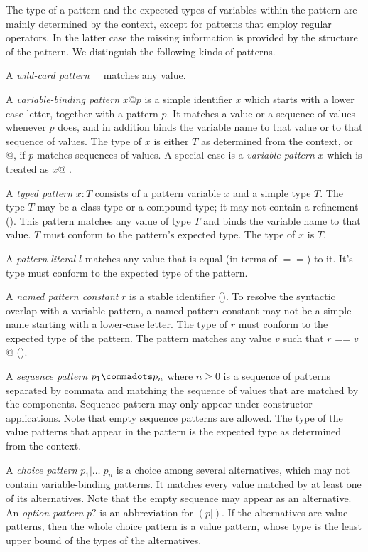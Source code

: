 \documentclass[11pt]{report}
\begin{document}
The type of a pattern and the expected types of variables within the
pattern are mainly determined by the context, except for patterns
that employ regular operators. In the latter case  the missing 
information is provided by the structure of the pattern. 
We distinguish the following kinds of patterns.

A {\em wild-card pattern} \_ matches any value. 

A {\em variable-binding pattern} $x @ p$ is a simple identifier $x$
which starts with a lower case letter, together with a pattern $p$. It
matches a value or a sequence of values whenever $p$ does, and in
addition binds the variable name to that value or to that sequence of
values. The type of $x$ is either $T$ as determined from the context, or
\verb@List[ T ]@, if $p$ matches sequences of values. A
special case is a {\em variable pattern} $x$ which is treated as $x @
\_$. 

A {\em typed pattern} $x: T$ consists of a pattern variable $x$ and a
simple type $T$. The type $T$ may be a class type or a compound type;
it may not contain a refinement ().  This
pattern matches any value of type $T$ and binds the variable name to
that value.  $T$ must conform to the pattern's expected type. The
type of $x$ is $T$.

A {\em pattern literal} $l$ matches any value that is equal (in terms
of $==$) to it. It's type must conform to the expected type of the
pattern.

A {\em named pattern constant} $r$ is a stable identifier
(). To resolve the syntactic overlap with a
variable pattern, a named pattern constant may not be a simple name
starting with a lower-case letter. The type of $r$ must conform
to the expected type of the pattern. The pattern matches any value $v$
such that \verb@$r$ == $v$@ ().

A {\em sequence pattern} $p_1 \commadots p_n$ where $n \geq 0$ is a
sequence of patterns separated by commata and matching the sequence of
values that are matched by the components. Sequence pattern may only
appear under constructor applications. Note that empty sequence
patterns are allowed. The type of the value patterns that appear in
the pattern is the expected type as determined from the context.

A {\em choice pattern} $p_1 | \ldots | p_n$ is a choice among several
alternatives, which may not contain variable-binding patterns. It
matches every value matched by at least one of its alternatives. Note
that the empty sequence may appear as an alternative.  An {\em option
pattern} $p?$ is an abbreviation for $(p| )$. If the alternatives
are value patterns, then the whole choice pattern is a value pattern,
whose type is the least upper bound of the types of the alternatives.
\end{document}
